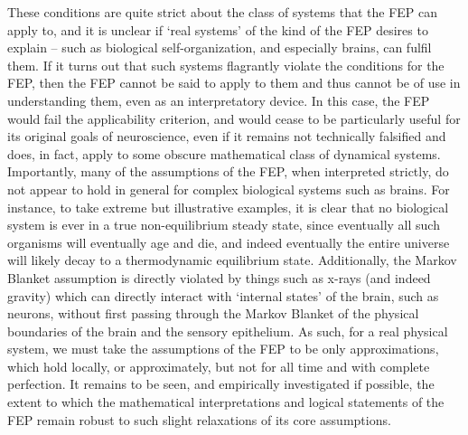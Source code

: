 These conditions are quite strict about the class of systems that the FEP can apply to, and it is unclear if `real systems' of the kind of the FEP desires to explain -- such as biological self-organization, and especially brains, can fulfil them. If it turns out that such systems flagrantly violate the conditions for the FEP, then the FEP cannot be said to apply to them and thus cannot be of use in understanding them, even as an interpretatory device. In this case, the FEP would fail the applicability criterion, and would cease to be particularly useful for its original goals of neuroscience, even if it remains not technically falsified and does, in fact, apply to some obscure mathematical class of dynamical systems. Importantly, many of the assumptions of the FEP, when interpreted strictly, do not appear to hold in general for complex biological systems such as brains. For instance, to take extreme but illustrative examples, it is clear that no biological system is ever in a true non-equilibrium steady state, since eventually all such organisms will eventually age and die, and indeed eventually the entire universe will likely decay to a thermodynamic equilibrium state. Additionally, the Markov Blanket assumption is directly violated by things such as x-rays (and indeed gravity) which can directly interact with `internal states' of the brain, such as neurons, without first passing through the Markov Blanket of the physical boundaries of the brain and the sensory epithelium. As such, for a real physical system, we must take the assumptions of the FEP to be only approximations, which hold locally, or approximately, but not for all time and with complete perfection. It remains to be seen, and empirically investigated if possible, the extent to which the mathematical interpretations and logical statements of the FEP remain robust to such slight relaxations of its core assumptions.

